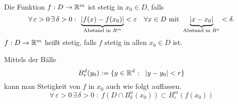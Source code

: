\documentclass[../ana1.tex]{subfiles}
\begin{document}
\begin{defi}[Stetigkeit]
    Die Funktion \( f: D\rightarrow \mathbb{R}^m \) ist stetig 
    in \( x_0 \in D \), falls
    \[ \forall \, \varepsilon > 0 \,\exists \, \delta > 0 
    \, \colon \, \underbrace{ \left| f(x) - f(x_0) 
    \right|}_{\text{Abstand in }R^m} < \varepsilon \quad 
    \forall x\in D \text{ mit } \underbrace{\left|x - x_0\right| 
    }_{\text{Abstand in } R^n} < \delta. \]
    \( f: D\rightarrow \mathbb{R}^m \) heißt stetig, falls \( f \) 
    stetig in allen \(x_0 \in D \) ist.
\end{defi}
\begin{bem}
    Mittels der Bälle 
    \[ B_r^d(y_0) := \{ y\in\mathbb{R}^d \;\colon \; 
    \left|y-y_0\right|<r \} \]
    kann man Stetigkeit von \( f \) in \( x_0 \) auch wie folgt
    auffassen.
    \[ \forall \, \varepsilon > 0 \,\exists \, \delta > 0 
    \;\colon \; f(D\cap B_\delta^n(x_0)) \subset 
    B_\varepsilon^m (f(x_0)) \]
\end{bem}
\end{document}
